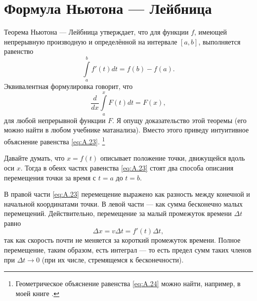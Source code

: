 \section{Формула Ньютона --- Лейбница}\label{Основная теорема анализа}

Теорема Ньютона --- Лейбница утверждает, что для функции $f$, имеющей непрерывную производную и определённой на интервале $[a,b]$, выполняется равенство
\begin{equation}
\int\limits_a^b f'(t)dt=f(b)-f(a).
\label{eq:A.23}
\end{equation}
Эквивалентная формулировка говорит, что
\begin{equation}
\frac{d}{dx} \int\limits_a^x F(t)dt=F(x),
\label{eq:A.24}
\end{equation}
для любой непрерывной функции $F$.
Я опущу доказательство этой теоремы (его можно найти в любом учебнике матанализа).
Вместо этого приведу интуитивное объяснение равенства \eqref{eq:A.23}.%
\footnote{Геометрическое объяснение равенства \eqref{eq:A.24} можно найти, например, в моей книге \cite{levi2009}.}

Давайте думать, что $x=f(t)$ описывает положение точки, движущейся вдоль оси $x$.
Тогда в обеих частях равенства \eqref{eq:A.23} стоят два способа описания перемещения точки за время с $t=a$ до $t=b$.

В правой части \eqref{eq:A.23} перемещение выражено как разность между конечной и начальной координатами точки.
В левой части --- как сумма бесконечно малых перемещений.
Действительно, перемещение за малый промежуток времени $\Delta t$ равно
\[\Delta x=v\Delta t=f'(t)\Delta t,\]
так как скорость почти не меняется за короткий промежуток времени.
Полное перемещение, таким образом, есть интеграл --- то есть предел сумм таких членов при $\Delta t\to0$ (при их числе, стремящемся к бесконечности).

